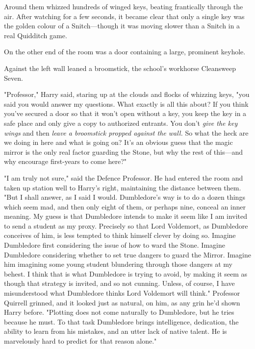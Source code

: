 Around them whizzed hundreds of winged keys, beating frantically through the
air. After watching for a few seconds, it became clear that only a single key
was the golden colour of a Snitch---though it was moving slower than a Snitch in
a real Quidditch game.

On the other end of the room was a door containing a large, prominent keyhole.

Against the left wall leaned a broomstick, the school's workhorse Cleansweep
Seven.

"Professor," Harry said, staring up at the clouds and flocks of whizzing keys,
"you said you would answer my questions. What exactly is all this about? If you
think you've secured a door so that it won't open without a key, you keep the
key in a safe place and only give a copy to authorized entrants. You don't
\emph{give the key wings} and then \emph{leave a broomstick propped against the
wall.} So what the heck are we doing in here and what is going on? It's an
obvious guess that the magic mirror is the only real factor guarding the Stone,
but why the rest of this---and why encourage first-years to come here?"

"I am truly not sure," said the Defence Professor. He had entered the room and
taken up station well to Harry's right, maintaining the distance between them.
"But I shall answer, as I said I would. Dumbledore's way is to do a dozen
things which seem mad, and then only eight of them, or perhaps nine, conceal an
inner meaning. My guess is that Dumbledore intends to make it seem like I am
invited to send a student as my proxy. Precisely so that Lord Voldemort, as
Dumbledore conceives of him, is less tempted to think himself clever by doing
so. Imagine Dumbledore first considering the issue of how to ward the Stone.
Imagine Dumbledore considering whether to set true dangers to guard the Mirror.
Imagine him imagining some young student blundering through those dangers at my
behest. I think that is what Dumbledore is trying to avoid, by making it seem
as though that strategy is invited, and so not cunning. Unless, of course, I
have misunderstood what Dumbledore thinks Lord Voldemort will think." Professor
Quirrell grinned, and it looked just as natural, on him, as any grin he'd shown
Harry before. "Plotting does not come naturally to Dumbledore, but he tries
because he must. To that task Dumbledore brings intelligence, dedication, the
ability to learn from his mistakes, and an utter lack of native talent. He is
marvelously hard to predict for that reason alone."

